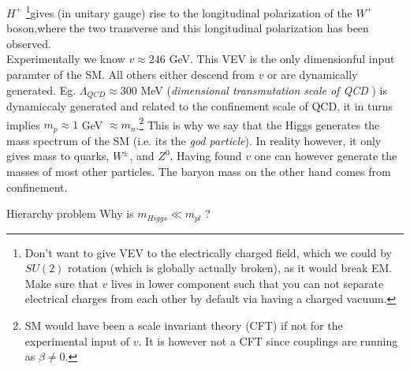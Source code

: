 $H^+$ \footnote{Don't want to give VEV to the electrically charged field, which we could by $SU(2)$ rotation (which is globally actually broken), as it would break EM. Make sure that $v$ lives in lower component such that you can not separate electrical charges from each other by default via having a charged vacuum.}gives (in unitary gauge) rise to the longitudinal polarization of the $W^+$ boson,where the two transverse and this longitudinal polarization has been observed.\\ Experimentally we know $v\approx 246$ GeV. This VEV is the only dimensionful input paramter of the SM. All others either descend from $v$ or are dynamically generated. Eg. $\Lambda_{QCD} \approx 300$ MeV (\emph{dimensional transmutation scale of QCD} ) is dynamiccaly generated and related to the confinement scale of QCD, it in turns implies $m_p\approx 1$ GeV $\approx m_n$.\footnote{SM would have been a scale invariant theory (CFT) if not for the experimental input of $v$. It is however not a CFT since couplings are running as $\beta \neq 0$.} This is why we say that the Higgs generates the mass spectrum of the SM (i.e. its the \emph{god particle}). In reality however, it only gives mass to quarks, $W^{\pm}$, and $Z^0$. Having found $v$ one can however generate the masses of most other particles. The baryon mass on the other hand comes from confinement.
\begin{mybox}{Hierarchy problem}
	Why is $m_{Higgs} \ll m_{pl}$ ?
\end{mybox}

















